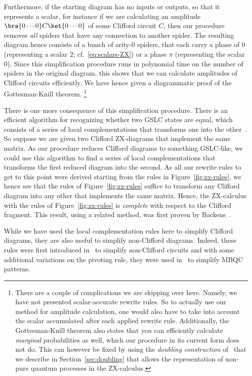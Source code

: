\documentclass[a4paper,onecolumn,superscriptaddress,11pt,%
				unpublished,%
				allowfontchageintitle,%
				]{quantumarticle}
\begin{document}
Furthermore, if the starting diagram has no inputs or outputs, so that it represents a scalar, for instance if we are calculating an amplitude $\bra{0\cdots 0}C\ket{0\cdots 0}$ of some Clifford circuit $C$, then our procedure removes \emph{all} spiders that have any connection to another spider. 
The resulting diagram hence consists of a bunch of arity-0 spiders, that each carry a phase of $0$ (representing a scalar $2$; cf.~\eqref{eq:scalars-ZX}) or a phase $\pi$ (representing the scalar $0$). 
Since this simplification procedure runs in polynomial time on the number of spiders in the original diagram, this shows that we can calculate amplitudes of Clifford circuits efficiently. We have hence given a diagrammatic proof of the Gottesman-Knill theorem.%
\footnote{There are a couple of complications we are skipping over here. Namely, we have not presented scalar-accurate rewrite rules. So to actually use our method for amplitude calculation, one would also have to take into account the scalar accumulated after each applied rewrite rule. Additionally, the Gottesman-Knill theorem also states that you can efficiently calculate \emph{marginal} probabilities as well, which our procedure in its current form does not do. This can however be fixed by using the \emph{doubling construction} of~\cite{CKbook} that we describe in Section~\ref{sec:doubling} that allows the representation of non-pure quantum processes in the ZX-calculus.}

There is one more consequence of this simplification procedure. There is an efficient algorithm for recognizing whether two GSLC states are equal, which consists of a series of local complementations that transforms one into the other~\cite{elliott2008graphical}. 
So suppose we are given two Clifford ZX-diagrams that implement the same matrix. As our procedure reduces Clifford diagrams to something GSLC-like, we could use this algorithm to find a series of local complementations that transforms the first reduced diagram into the second. 
As all our rewrite rules to get to this point were derived starting from the rules in Figure~\ref{fig:zx-rules}, we hence see that the rules of Figure~\ref{fig:zx-rules} suffice to transform any Clifford diagram into any other that implements the same matrix. Hence, the ZX-calculus with the rules of Figure~\ref{fig:zx-rules} is \emph{complete} with respect to the Clifford fragment. This result, using a related method, was first proven by Backens~\cite{BackensCompleteness}.

While we have used the local complementation rules here to simplify Clifford diagrams, they are also useful to simplify non-Clifford diagrams. Indeed, these rules were first introduced in~\cite{cliffsimp} to simplify non-Clifford circuits and with some additional variations on the pivoting rule, they were used in~\cite{wetering-gflow} to simplify MBQC patterns.
\end{document}
